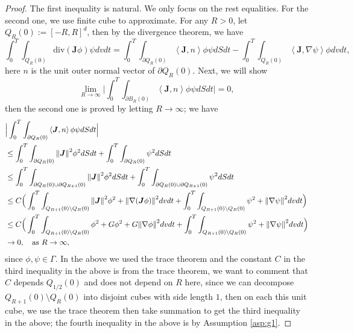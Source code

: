 \documentclass[a4paper, 11pt]{article}
\newcommand{\inner}[2]{\left< #1 , #2 \right>}
\theoremstyle{plain}
\theoremstyle{remark}
\theoremstyle{definition}
\renewcommand{\div}{\mathrm{div}}
\newcommand{\intt}{\int_0^T}
\newcommand{\J}{\boldsymbol{J}}
\begin{document}
\begin{proof}
	The first inequality is natural. We only focus on the rest equalities. For the second one, we use finite cube to approximate. For any $R>0$, let $Q_{R}(0):=[-R,R]^d$, then by the divergence theorem, we have
    \begin{equation*}
		\intt\int_{Q_R(0)} \div\left(\J\phi\right)\psi dvdt=\intt\int_{\partial Q_R(0)}\inner{\J}{n}\phi\psi dSdt-\intt\int_{Q_R(0)} \inner{\J}{\nabla\psi}\phi dvdt,
	\end{equation*}
	here $n$ is the unit outer normal vector of $\partial Q_R(0)$. Next, we will show
	\begin{equation*}
		\lim_{R\to\infty}\Big|\intt\int_{\partial B_R(0)}\inner{\J}{n}\phi\psi dSdt\Big|=0,
	\end{equation*}
	then the second one is proved by letting $R\to\infty$; we have
	\begin{equation*}
		\begin{aligned}
			&\Big|\intt\int_{\partial Q_R(0)}\inner{\J}{n}\phi\psi dSdt\Big|\\
			&\leq \intt\int_{\partial Q_R(0)}\norm{\J}^2\phi^2dSdt+\intt\int_{\partial Q_R(0)}\psi^2dSdt\\
			&\leq \intt\int_{\partial Q_R(0)\cup\partial Q_{R+1}(0)}\norm{\J}^2\phi^2dSdt+\intt\int_{\partial Q_R(0)\cup\partial Q_{R+1}(0)}\psi^2dSdt\\
			&\leq C\Big(\intt\int_{Q_{R+1}(0)\setminus Q_R(0)}\norm{\J}^2\phi^2+\norm{\nabla(\J\phi)}^2dvdt+\intt\int_{Q_{R+1}(0)\setminus Q_R(0)}\psi^2+\norm{\nabla\psi}^2dvdt\Big)\\
			&\leq C\Big(\intt\int_{Q_{R+1}(0)\setminus Q_R(0)}\phi^2+G\phi^2+G\norm{\nabla\phi}^2dvdt+\intt\int_{Q_{R+1}(0)\setminus Q_R(0)}\psi^2+\norm{\nabla\psi}^2dvdt\Big)\\
			&\to 0,\quad \text{as } R\to\infty,
		\end{aligned}
	\end{equation*}
	since $\phi,\psi\in\Gamma$. In the above we used the trace theorem and the constant $C$ in the third inequality in the above is from the trace theorem, we want to comment that $C$ depends $Q_{1/2}(0)$ and does not depend on $R$ here, since we can decompose $Q_{R+1}(0)\setminus Q_R(0)$ into disjoint cubes with side length $1$, then on each this unit cube, we use the trace theorem then take summation to get the third inequality in the above; the fourth inequality in the above is by Assumption \ref{asp:g1}. 
	

\end{proof}
\end{document}
